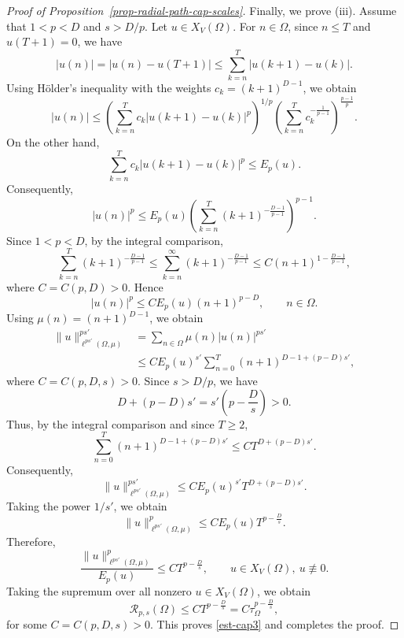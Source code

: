 \documentclass[twoside,12pt,letter]{article}
\theoremstyle{plain}
\theoremstyle{definition}
\theoremstyle{remark}
\numberwithin{equation}{section}
\begin{document}
\begin{proof}[Proof of Proposition~\ref{prop-radial-path-cap-scales}]
Finally, we prove {\rm(iii)}. Assume that \(1<p<D\) and \(s>D/p\). Let
\(u\in X_V(\Omega)\). For \(n\in\Omega\), since \(n\le T\) and \(u(T+1)=0\),
we have
\[
|u(n)|
=
|u(n)-u(T+1)|
\le
\sum_{k=n}^{T}|u(k+1)-u(k)|.
\]
Using H\"older's inequality with the weights \(c_k=(k+1)^{D-1}\), we obtain
\[
|u(n)|
\le
\left(
\sum_{k=n}^{T}c_k|u(k+1)-u(k)|^p
\right)^{1/p}
\left(
\sum_{k=n}^{T}c_k^{-\frac{1}{p-1}}
\right)^{\frac{p-1}{p}}.
\]
On the other hand,
\[
\sum_{k=n}^{T}c_k|u(k+1)-u(k)|^p
\le
E_p(u).
\]
Consequently,
\[
|u(n)|^p
\le
E_p(u)
\left(
\sum_{k=n}^{T}(k+1)^{-\frac{D-1}{p-1}}
\right)^{p-1}.
\]
Since \(1<p<D\), by the integral comparison,
\[
\sum_{k=n}^{T}(k+1)^{-\frac{D-1}{p-1}}
\le
\sum_{k=n}^{\infty}(k+1)^{-\frac{D-1}{p-1}}
\le
C(n+1)^{1-\frac{D-1}{p-1}},
\]
where \(C=C(p,D)>0\). Hence
\[
|u(n)|^p
\le
C E_p(u)(n+1)^{p-D},
\qquad n\in\Omega.
\]
Using \(\mu(n)=(n+1)^{D-1}\), we obtain
\[
\begin{aligned}
\|u\|_{\ell^{ps'}(\Omega,\mu)}^{ps'}
&=
\sum_{n\in\Omega}\mu(n)|u(n)|^{ps'}  \\
&\le
C E_p(u)^{s'}
\sum_{n=0}^{T}(n+1)^{D-1+(p-D)s'},
\end{aligned}
\]
where \(C=C(p,D,s)>0\). Since \(s>D/p\), we have
\[
D+(p-D)s'
=
s'\left(p-\frac{D}{s}\right)>0.
\]
Thus, by the integral comparison and since \(T\ge 2\),
\[
\sum_{n=0}^{T}(n+1)^{D-1+(p-D)s'}
\le
C T^{D+(p-D)s'}.
\]
Consequently,
\[
\|u\|_{\ell^{ps'}(\Omega,\mu)}^{ps'}
\le
C E_p(u)^{s'}T^{D+(p-D)s'}.
\]
Taking the power \(1/s'\), we obtain
\[
\|u\|_{\ell^{ps'}(\Omega,\mu)}^{p}
\le
C E_p(u)T^{p-\frac{D}{s}}.
\]
Therefore,
\[
\frac{\|u\|_{\ell^{ps'}(\Omega,\mu)}^{p}}{E_p(u)}
\le
C T^{p-\frac{D}{s}},
\qquad u\in X_V(\Omega),\ u\not\equiv 0.
\]
Taking the supremum over all nonzero \(u\in X_V(\Omega)\), we obtain
\[
\mathcal{R}_{p,s}(\Omega)
\le
C T^{p-\frac{D}{s}}
=
C\tau_\Omega^{p-\frac{D}{s}},
\]
for some \(C=C(p,D,s)>0\). This proves \eqref{est-cap3} and completes the
proof.
\end{proof}
\end{document}
